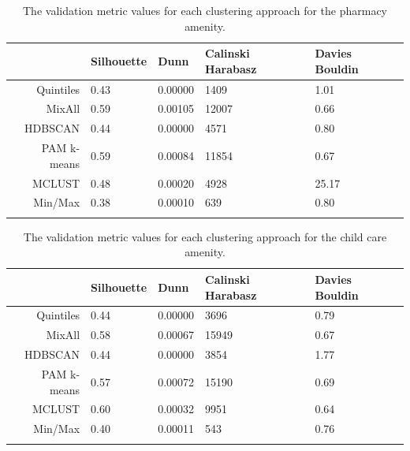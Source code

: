 \documentclass[11pt, a4paper]{article}
\begin{document}
\centering
\begin{longtable}[H]{|r|llll|}
  \hline
 & Silhouette & Dunn & Calinski Harabasz & Davies Bouldin \\ 
  \hline
Quintiles & 0.43 & 0.00000 &  1409 &  1.01 \\ 
   \hline
MixAll & 0.59 & 0.00105 & 12007 &  0.66 \\ 
   \hline
HDBSCAN & 0.44 & 0.00000 &  4571 &  0.80 \\ 
   \hline
PAM k-means & 0.59 & 0.00084 & 11854 &  0.67 \\ 
   \hline
MCLUST & 0.48 & 0.00020 &  4928 & 25.17 \\ 
   \hline
Min/Max & 0.38 & 0.00010 &   639 &  0.80 \\ 
   \hline
\caption[Pharmacy validation metrics]{The validation metric values for each clustering approach for the pharmacy amenity.}\label{pharmacyvalid}
\end{longtable}









\centering
\begin{longtable}[H]{|r|llll|}
 \hline
 & Silhouette & Dunn & Calinski Harabasz & Davies Bouldin \\ 
  \hline
Quintiles & 0.44 & 0.00000 &  3696 & 0.79 \\ 
   \hline
MixAll & 0.58 & 0.00067 & 15949 & 0.67 \\ 
   \hline
HDBSCAN & 0.44 & 0.00000 &  3854 & 1.77 \\ 
   \hline
PAM k-means & 0.57 & 0.00072 & 15190 & 0.69 \\ 
   \hline
MCLUST & 0.60 & 0.00032 &  9951 & 0.64 \\ 
   \hline
Min/Max & 0.40 & 0.00011 &   543 & 0.76 \\ 
   \hline
\caption[Child care validation metrics]{The validation metric values for each clustering approach for the child care amenity.}\label{childcarevalid}
\end{longtable}
\end{document}
